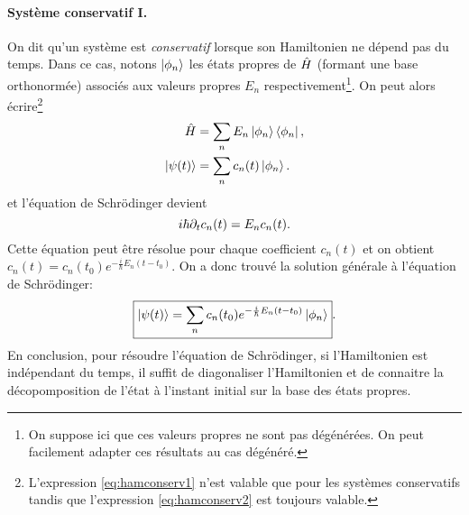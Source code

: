 \documentclass[11pt,a4paper,oneside]{article}
\begin{document}
\paragraph{Système conservatif I.} On dit qu'un système est \emph{conservatif} lorsque son Hamiltonien ne dépend pas du temps. Dans ce cas, notons $\ket{\phi_n}$ les états propres de $\hat{H}$ (formant une base orthonormée) associés aux valeurs propres $E_n$ respectivement\footnote{On suppose ici que ces valeurs propres ne sont pas dégénérées. On peut facilement adapter ces résultats au cas dégénéré.}. On peut alors écrire\footnote{L'expression \eqref{eq:hamconserv1} n'est valable que pour les systèmes conservatifs tandis que l'expression \eqref{eq:hamconserv2} est toujours valable.}
\begin{align}
    \hat{H} &= \sum_n E_n\ket{\phi_n}\bra{\phi_n},\label{eq:hamconserv1}\\
    \ket{\psi(t)} &= \sum_n c_n(t)\ket{\phi_n}\label{eq:hamconserv2}.
\end{align}
et l'équation de Schrödinger devient
\begin{equation}
    i\hbar\partial_t c_n(t) = E_n c_n(t).
\end{equation}
Cette équation peut être résolue pour chaque coefficient $c_n(t)$ et on obtient $c_n(t)=c_n(t_0)e^{-\frac{i}{\hbar}E_n(t-t_0)}$. On a donc trouvé la solution générale à l'équation de Schrödinger:
\begin{equation}
    \boxed{\ket{\psi(t)} = \sum_n c_n(t_0)e^{-\frac{i}{\hbar}E_n(t-t_0)}\ket{\phi_n}}\label{eq:solgenschr}.
\end{equation}
En conclusion, pour résoudre l'équation de Schrödinger, si l'Hamiltonien est indépendant du temps, il suffit de diagonaliser l'Hamiltonien et de connaitre la décopomposition de l'état à l'instant initial sur la base des états propres.
\end{document}
